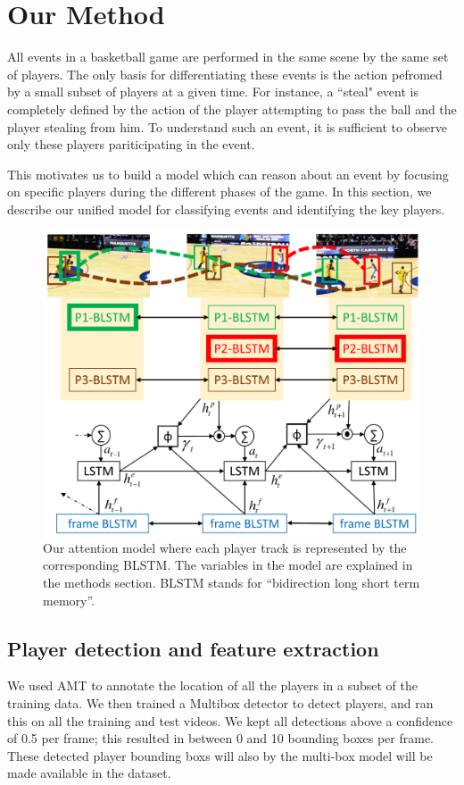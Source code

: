 \section{Our Method}

All events in a basketball game are performed in the same scene by the same set
of players. The only basis for differentiating these events is the action
pefromed by a small subset of players at a given time.  For instance, a
``steal" event is completely defined by the action of the player attempting to
pass the ball and the player stealing from him.  To understand such an event,
it is sufficient to observe only these players pariticipating in the event.

This motivates us to build a model which can reason about an event by focusing
on specific players during the different phases of the game.
In this section, we describe our unified model for classifying events
and identifying the key players.

\begin{figure}[t!]
\begin{center}
    \includegraphics[width=3 in]{images/system_figure_1_cropped_v2.pdf}
\end{center}
   \caption{Our attention model where each player track is represented by the
     corresponding BLSTM. The variables in the model are explained in the
     methods section.  BLSTM stands for ``bidirection long short term memory''.
}
\label{fig:model}
\end{figure}


\subsection{Player detection and feature extraction}

We used AMT to annotate the location of all the players in a subset 
of the training data. We then trained a Multibox detector to detect players,
and ran this on all the training and test videos.  We kept all detections above
a confidence of 0.5 per frame; this resulted in between 0 and 10 bounding
boxes per frame.  These detected player bounding boxs will also by the
multi-box model will be made available in the dataset.

